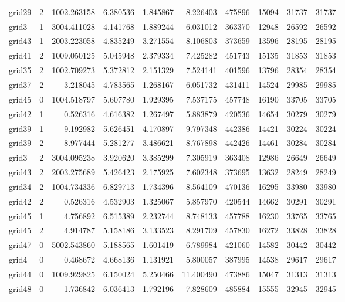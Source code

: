 \begin{longtable}{|l|r|r|r|r|r|r|r|r|r|}
grid29 & 2 & 1002.263158 & 6.380536 & 1.845867 & 8.226403 & 475896 & 15094 & 31737 & 31737 \\
grid3 & 1 & 3004.411028 & 4.141768 & 1.889244 & 6.031012 & 363370 & 12948 & 26592 & 26592 \\
grid43 & 1 & 2003.223058 & 4.835249 & 3.271554 & 8.106803 & 373659 & 13596 & 28195 & 28195 \\
grid41 & 2 & 1009.050125 & 5.045948 & 2.379334 & 7.425282 & 451743 & 15135 & 31853 & 31853 \\
grid35 & 2 & 1002.709273 & 5.372812 & 2.151329 & 7.524141 & 401596 & 13796 & 28354 & 28354 \\
grid37 & 2 & 3.218045 & 4.783565 & 1.268167 & 6.051732 & 431411 & 14524 & 29985 & 29985 \\
grid45 & 0 & 1004.518797 & 5.607780 & 1.929395 & 7.537175 & 457748 & 16190 & 33705 & 33705 \\
grid42 & 1 & 0.526316 & 4.616382 & 1.267497 & 5.883879 & 420536 & 14654 & 30279 & 30279 \\
grid39 & 1 & 9.192982 & 5.626451 & 4.170897 & 9.797348 & 442386 & 14421 & 30224 & 30224 \\
grid39 & 2 & 8.977444 & 5.281277 & 3.486621 & 8.767898 & 442426 & 14461 & 30284 & 30284 \\
grid3 & 2 & 3004.095238 & 3.920620 & 3.385299 & 7.305919 & 363408 & 12986 & 26649 & 26649 \\
grid43 & 2 & 2003.275689 & 5.426423 & 2.175925 & 7.602348 & 373695 & 13632 & 28249 & 28249 \\
grid34 & 2 & 1004.734336 & 6.829713 & 1.734396 & 8.564109 & 470136 & 16295 & 33980 & 33980 \\
grid42 & 2 & 0.526316 & 4.532903 & 1.325067 & 5.857970 & 420544 & 14662 & 30291 & 30291 \\
grid45 & 1 & 4.756892 & 6.515389 & 2.232744 & 8.748133 & 457788 & 16230 & 33765 & 33765 \\
grid45 & 2 & 4.914787 & 5.158186 & 3.133523 & 8.291709 & 457830 & 16272 & 33828 & 33828 \\
grid47 & 0 & 5002.543860 & 5.188565 & 1.601419 & 6.789984 & 421060 & 14582 & 30442 & 30442 \\
grid4 & 0 & 0.468672 & 4.668136 & 1.131921 & 5.800057 & 387995 & 14538 & 29617 & 29617 \\
grid44 & 0 & 1009.929825 & 6.150024 & 5.250466 & 11.400490 & 473886 & 15047 & 31313 & 31313 \\
grid48 & 0 & 1.736842 & 6.036413 & 1.792196 & 7.828609 & 485884 & 15555 & 32945 & 32945 \\

\end{longtable}
